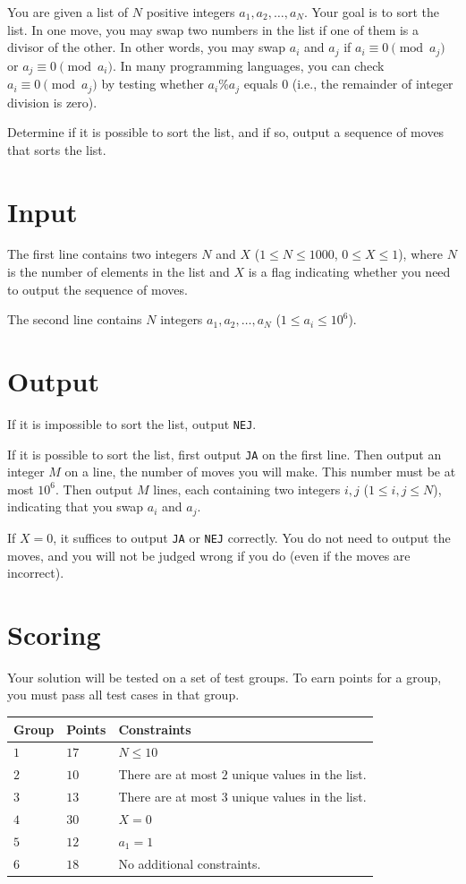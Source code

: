 
You are given a list of $N$ positive integers $a_1, a_2, \dots, a_N$. Your goal is to sort the list. In one move, you may swap
two numbers in the list if one of them is a divisor of the other. In other words, you may swap $a_i$ and $a_j$ if $a_i \equiv 0 \pmod{a_j}$ or 
$a_j \equiv 0 \pmod{a_i}$.
In many programming languages, you can check $a_i \equiv 0 \pmod{a_j}$ by testing whether $a_i \% a_j$ equals $0$ (i.e., the remainder of integer division is zero).

Determine if it is possible to sort the list, and if so, output a sequence of moves that sorts the list.

\section*{Input}
The first line contains two integers $N$ and $X$ ($1 \leq N \leq 1000$, $0 \leq X \leq 1$), where $N$ is the number of elements in the list and $X$
is a flag indicating whether you need to output the sequence of moves.

The second line contains $N$ integers $a_1, a_2, \dots, a_N$ ($1 \leq a_i \leq 10^6$).

\section*{Output}
If it is impossible to sort the list, output \verb|NEJ|.

If it is possible to sort the list, first output \verb|JA| on the first line. Then output an integer $M$ on a line, the number of moves you will make.
This number must be at most $10^6$. Then output $M$ lines, each containing two integers $i, j$ ($1 \leq i,j \leq N$),
indicating that you swap $a_i$ and $a_j$.

If $X = 0$, it suffices to output \verb|JA| or \verb|NEJ| correctly. You do not need to output the moves, and you will not be judged wrong
if you do (even if the moves are incorrect).

\section*{Scoring}
Your solution will be tested on a set of test groups.
To earn points for a group, you must pass all test cases in that group.

\noindent
\begin{tabular}{| l | l | p{12cm} |}
  \hline
  \textbf{Group} & \textbf{Points} & \textbf{Constraints} \\ \hline
  $1$    & $17$       & $N \leq 10$ \\ \hline
  $2$    & $10$       & There are at most $2$ unique values in the list. \\ \hline
  $3$    & $13$       & There are at most $3$ unique values in the list. \\ \hline
  $4$    & $30$       & $X = 0$ \\ \hline
  $5$    & $12$       & $a_1 = 1$ \\ \hline
  $6$    & $18$       & No additional constraints. \\ \hline
\end{tabular}
